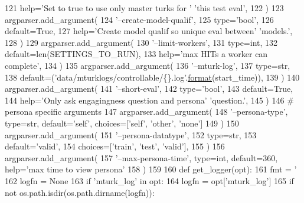 \begin{DoxyCode}
{121         help=\textcolor{stringliteral}{'Set to true to use only master turks for '} \textcolor{stringliteral}{'this test eval'},
122     )
123     argparser.add\_argument(
124         \textcolor{stringliteral}{'--create-model-qualif'},
125         type=\textcolor{stringliteral}{'bool'},
126         default=\textcolor{keyword}{True},
127         help=\textcolor{stringliteral}{'Create model qualif so unique eval between'} \textcolor{stringliteral}{'models.'},
128     )
129     argparser.add\_argument(
130         \textcolor{stringliteral}{'--limit-workers'},
131         type=int,
132         default=len(SETTINGS\_TO\_RUN),
133         help=\textcolor{stringliteral}{'max HITs a worker can complete'},
134     )
135     argparser.add\_argument(
136         \textcolor{stringliteral}{'--mturk-log'},
137         type=str,
138         default=(\textcolor{stringliteral}{'data/mturklogs/controllable/\{\}.log'}.\hyperlink{namespaceparlai_1_1chat__service_1_1services_1_1messenger_1_1shared__utils_a32e2e2022b824fbaf80c747160b52a76}{format}(start\_time)),
139     )
140     argparser.add\_argument(
141         \textcolor{stringliteral}{'--short-eval'},
142         type=\textcolor{stringliteral}{'bool'},
143         default=\textcolor{keyword}{True},
144         help=\textcolor{stringliteral}{'Only ask engagingness question and persona'} \textcolor{stringliteral}{'question.'},
145     )
146     \textcolor{comment}{# persona specific arguments}
147     argparser.add\_argument(
148         \textcolor{stringliteral}{'--persona-type'}, type=str, default=\textcolor{stringliteral}{'self'}, choices=[\textcolor{stringliteral}{'self'}, \textcolor{stringliteral}{'other'}, \textcolor{stringliteral}{'none'}]
149     )
150     argparser.add\_argument(
151         \textcolor{stringliteral}{'--persona-datatype'},
152         type=str,
153         default=\textcolor{stringliteral}{'valid'},
154         choices=[\textcolor{stringliteral}{'train'}, \textcolor{stringliteral}{'test'}, \textcolor{stringliteral}{'valid'}],
155     )
156     argparser.add\_argument(
157         \textcolor{stringliteral}{'--max-persona-time'}, type=int, default=360, help=\textcolor{stringliteral}{'max time to view persona'}
158     )
159 
160     \textcolor{keyword}{def }get\_logger(opt):
161         fmt = \textcolor{stringliteral}{'%
162         logfn = \textcolor{keywordtype}{None}
163         \textcolor{keywordflow}{if} \textcolor{stringliteral}{'mturk\_log'} \textcolor{keywordflow}{in} opt:
164             logfn = opt[\textcolor{stringliteral}{'mturk\_log'}]
165             \textcolor{keywordflow}{if} \textcolor{keywordflow}{not} os.path.isdir(os.path.dirname(logfn)):
}}
\end{DoxyCode}
